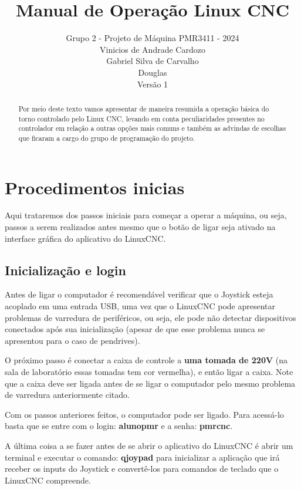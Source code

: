 \documentclass[twoside,a4paper]{refart}
\title{Manual de Operação Linux CNC}
\author{Grupo 2 - Projeto de Máquina PMR3411 - 2024 \\
Vinicios de Andrade Cardozo \\
Gabriel Silva de Carvalho  \\
Douglas \\
Versão 1}
\date{}
\begin{document}
\maketitle

\begin{abstract}
Por meio deste texto vamos apresentar de maneira resumida a operação básica do torno controlado pelo Linux CNC, levando em conta peculiaridades presentes no controlador em relação a outras opções mais comuns e também as advindas de escolhas que ficaram a cargo do grupo de programação do projeto.
\end{abstract}

\tableofcontents

\newpage



\section{Procedimentos inicias}

Aqui trataremos dos passos iniciais para começar a operar a máquina, ou seja, passos a serem realizados antes mesmo que o botão de ligar seja ativado na interface gráfica do aplicativo do LinuxCNC. 

\subsection{Inicialização e login}

Antes de ligar o computador é recomendável verificar que o Joystick esteja acoplado em uma entrada USB, uma vez que o LinuxCNC pode apresentar problemas de varredura de periféricos, ou seja, ele pode não detectar dispositivos conectados após sua inicialização (apesar de que esse problema nunca se apresentou para o caso de pendrives).

O próximo passo é conectar a caixa de controle a \textbf{uma tomada de 220V} (na sala de laboratório essas tomadas tem cor vermelha), e então ligar a caixa. Note que a caixa deve ser ligada antes de se ligar o computador pelo mesmo problema de varredura anteriormente citado.

Com os passos anteriores feitos, o computador pode ser ligado. Para acessá-lo basta que se entre com o login: \textbf{alunopmr} e a senha: \textbf{pmrcnc}. 

A última coisa a se fazer antes de se abrir o aplicativo do LinuxCNC é abrir um terminal e executar o comando: \textbf{qjoypad} para inicializar a aplicação que irá receber os inputs do Joystick e convertê-los para comandos de teclado que o LinuxCNC compreende. 
\end{document}
